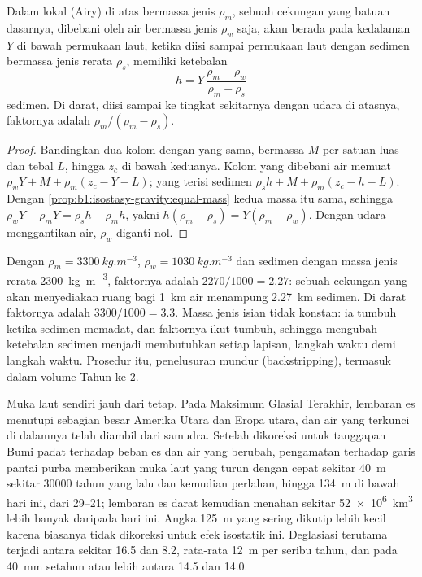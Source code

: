 \begin{proposition}\label{prop:b1:diagenesis-basins:loading}
Dalam  lokal (Airy) di atas  bermassa jenis $\rho_m$, sebuah cekungan yang batuan dasarnya, dibebani oleh air bermassa jenis $\rho_w$ saja, akan berada pada kedalaman $Y$ di bawah permukaan laut, ketika diisi sampai permukaan laut dengan sedimen bermassa jenis rerata $\rho_s$, memiliki ketebalan
\[
  h = Y\,\frac{\rho_m - \rho_w}{\rho_m - \rho_s}
\]
sedimen. Di darat, diisi sampai ke tingkat sekitarnya dengan udara di atasnya, faktornya adalah $\rho_m/(\rho_m - \rho_s)$.
\end{proposition}

\begin{proof}
Bandingkan dua kolom dengan  yang sama, bermassa $M$ per satuan luas dan tebal $L$, hingga  $z_c$ di bawah keduanya. Kolom yang dibebani air memuat $\rho_w Y + M + \rho_m(z_c - Y - L)$; yang terisi sedimen $\rho_s h + M + \rho_m(z_c - h - L)$. Dengan \cref{prop:b1:isostasy-gravity:equal-mass} kedua massa itu sama, sehingga $\rho_w Y - \rho_m Y = \rho_s h - \rho_m h$, yakni $h(\rho_m - \rho_s) =
Y(\rho_m - \rho_w)$. Dengan udara menggantikan air, $\rho_w$ diganti nol.
\end{proof}

Dengan $\rho_m = \qty{3300}{kg.m^{-3}}$, $\rho_w = \qty{1030}{kg.m^{-3}}$ dan sedimen dengan massa jenis rerata \qty{2300}{kg.m^{-3}}, faktornya adalah $2270/1000 = \num{2.27}$: sebuah cekungan yang  akan menyediakan ruang bagi \qty{1}{km} air menampung \qty{2.27}{km} sedimen. Di darat faktornya adalah $3300/1000 = \num{3.3}$. Massa jenis isian tidak konstan: ia tumbuh ketika sedimen memadat, dan faktornya ikut tumbuh, sehingga mengubah ketebalan sedimen menjadi  membutuhkan  setiap lapisan, langkah waktu demi langkah waktu. Prosedur itu, penelusuran mundur (backstripping), termasuk dalam volume Tahun ke-2.

Muka laut sendiri jauh dari tetap. Pada Maksimum Glasial Terakhir, lembaran es menutupi sebagian besar Amerika Utara dan Eropa utara, dan air yang terkunci di dalamnya telah diambil dari samudra. Setelah dikoreksi untuk tanggapan Bumi padat terhadap beban es dan air yang berubah, pengamatan terhadap garis pantai purba memberikan muka laut yang turun dengan cepat sekitar \qty{40}{m} sekitar \num{30000} tahun yang lalu dan kemudian perlahan, hingga \qty{134}{m} di bawah hari ini, dari \qtyrange{29}{21}{\ka}; lembaran es darat kemudian menahan sekitar \qty{52e6}{km^3} lebih banyak daripada hari ini. Angka \qty{125}{m} yang sering dikutip lebih kecil karena biasanya tidak dikoreksi untuk efek isostatik ini. Deglasiasi terutama terjadi antara sekitar \qty{16.5}{\ka} dan \qty{8.2}{\ka}, rata-rata \qty{12}{m} per seribu tahun, dan pada \qty{40}{mm} setahun atau lebih antara \qty{14.5}{\ka} dan \qty{14.0}{\ka}.


